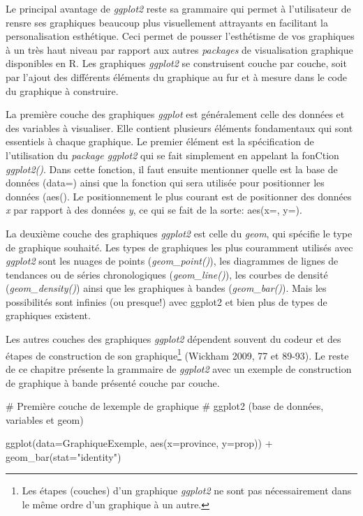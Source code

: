 \documentclass[
  letterpaper,
  DIV=11,
  numbers=noendperiod]{scrreprt}
\newenvironment{Shaded}{\begin{snugshade}}{\end{snugshade}}
\newcommand{\AttributeTok}[1]{\textcolor[rgb]{0.40,0.45,0.13}{#1}}
\newcommand{\CommentTok}[1]{\textcolor[rgb]{0.37,0.37,0.37}{#1}}
\newcommand{\FunctionTok}[1]{\textcolor[rgb]{0.28,0.35,0.67}{#1}}
\newcommand{\NormalTok}[1]{\textcolor[rgb]{0.00,0.23,0.31}{#1}}
\newcommand{\SpecialCharTok}[1]{\textcolor[rgb]{0.37,0.37,0.37}{#1}}
\newcommand{\StringTok}[1]{\textcolor[rgb]{0.13,0.47,0.30}{#1}}
\begin{document}
Le principal avantage de \emph{ggplot2} reste sa grammaire qui permet à
l'utilisateur de rensre ses graphiques beaucoup plus visuellement
attrayants en facilitant la personalisation esthétique. Ceci permet de
pousser l'esthétisme de vos graphiques à un très haut niveau par rapport
aux autres \emph{packages} de visualisation graphique disponibles en R.
Les graphiques \emph{ggplot2} se construisent couche par couche, soit
par l'ajout des différents éléments du graphique au fur et à mesure dans
le code du graphique à construire.

La première couche des graphiques \emph{ggplot} est généralement celle
des données et des variables à visualiser. Elle contient plusieurs
éléments fondamentaux qui sont essentiels à chaque graphique. Le premier
élément est la spécification de l'utilisation du \emph{package ggplot2}
qui se fait simplement en appelant la fonCtion \emph{ggplot2()}. Dans
cette fonction, il faut ensuite mentionner quelle est la base de données
(data=) ainsi que la fonction qui sera utilisée pour positionner les
données (aes(). Le positionnement le plus courant est de positionner des
données \emph{x} par rapport à des données \emph{y}, ce qui se fait de
la sorte: aes(x=, y=).

La deuxième couche des graphiques \emph{ggplot2} est celle du
\emph{geom}, qui spécifie le type de graphique souhaité. Les types de
graphiques les plus couramment utilisés avec \emph{ggplot2} sont les
nuages de points (\emph{geom\_point()}), les diagrammes de lignes de
tendances ou de séries chronologiques (\emph{geom\_line()}), les courbes
de densité (\emph{geom\_density()}) ainsi que les graphiques à bandes
(\emph{geom\_bar()}). Mais les possibilités sont infinies (ou presque!)
avec ggplot2 et bien plus de types de graphiques existent.

Les autres couches des graphiques \emph{ggplot2} dépendent souvent du
codeur et des étapes de construction de son graphique\footnote{Les
  étapes (couches) d'un graphique \emph{ggplot2} ne sont pas
  nécessairement dans le même ordre d'un graphique à un autre.} (Wickham
2009, 77 et 89-93). Le reste de ce chapitre présente la grammaire de
\emph{ggplot2} avec un exemple de construction de graphique à bande
présenté couche par couche.

\begin{Shaded}
\begin{Highlighting}[]
\CommentTok{\# Première couche de l\textquotesingle{}exemple de graphique}
\CommentTok{\# ggplot2 (base de données, variables et geom)}

\FunctionTok{ggplot}\NormalTok{(}\AttributeTok{data=}\NormalTok{GraphiqueExemple, }\FunctionTok{aes}\NormalTok{(}\AttributeTok{x=}\NormalTok{province, }\AttributeTok{y=}\NormalTok{prop)) }\SpecialCharTok{+}
  \FunctionTok{geom\_bar}\NormalTok{(}\AttributeTok{stat=}\StringTok{"identity"}\NormalTok{) }
\end{Highlighting}
\end{Shaded}
\end{document}
